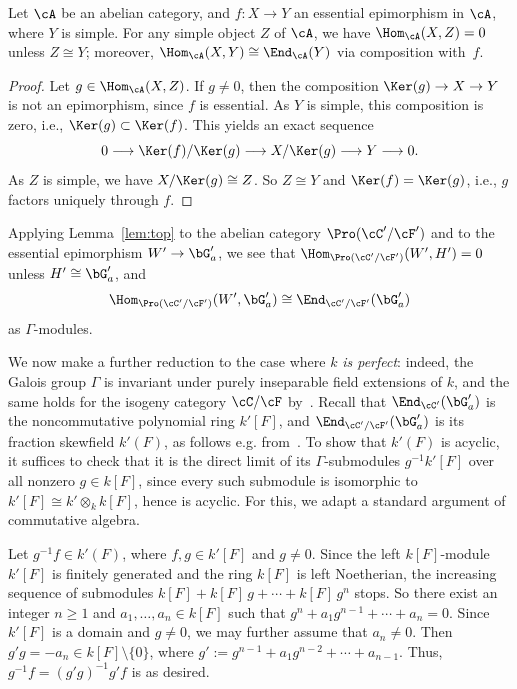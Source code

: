\begin{lemm}\label{lem:top}
Let $\cA$ be an abelian category, and $f : X \to Y$ an essential epimorphism in $\cA$, where $Y$ is simple. For any simple object $Z$ of $\cA$, we have $\Hom_{\cA}(X,Z) = 0$ unless $Z \cong Y$; moreover, $\Hom_{\cA}(X,Y) \cong \End_{\cA}(Y)$ via composition with~$f$.
\end{lemm}

\begin{proof}
Let $g \in \Hom_{\cA}(X,Z)$. If $g \neq 0$, then the composition $\Ker(g) \to X \to Y$ is not an epimorphism, since $f$ is essential. As $Y$ is simple, this composition is zero, i.e., $\Ker(g) \subset \Ker(f)$. This yields an exact sequence
\[
0 \longrightarrow \Ker(f)/\Ker(g) \longrightarrow X/\Ker(g) \longrightarrow Y \longrightarrow 0.
\]
As $Z$ is simple, we have $X/\Ker(g) \cong Z$. So $Z \cong Y$ and $\Ker(f) = \Ker(g)$, i.e., $g$ factors uniquely through $f$.
\end{proof}

Applying Lemma~\ref{lem:top} to the abelian category $\Pro(\cC'/\cF')$ and to the essential epimorphism $W' \to \bG'_a$, we see that $\Hom_{\Pro(\cC'/\cF')}(W',H') = 0$ unless $H' \cong \bG'_a$, and
\[
\Hom_{\Pro(\cC'/\cF')}(W',\bG'_a)
\cong \End_{\cC'/\cF'}(\bG'_a)
\]
as $\Gamma$-modules.

We now make a further reduction to the case where $k$ \emph{is perfect}: indeed, the Galois group $\Gamma$ is invariant under purely inseparable field extensions of $k$, and the same holds for the isogeny category $\cC/\cF$ by~\cite[Thm.~3.11]{Br17a}. Recall that $\End_{\cC'}(\bG'_a)$ is the noncommutative polynomial ring $k'[F]$, and $\End_{\cC'/\cF'}(\bG'_a)$ is its fraction skewfield $k'(F)$, as follows e.g. from~\cite[V.3.6.7]{DG}. To show that $k'(F)$ is acyclic, it suffices to check that it is the direct limit of its $\Gamma$-submodules $g^{-1} k'[F]$ over all nonzero $g \in k[F]$, since every such submodule is isomorphic to $k'[F] \cong k' \otimes_k k[F]$, hence is acyclic. For this, we adapt a standard argument of commutative algebra.

Let $g^{-1}f \in k'(F)$, where $f,g \in k'[F]$ and $g \neq 0$. Since the left $k[F]$-module $k'[F]$ is finitely generated and the ring $k[F]$ is left Noetherian, the increasing sequence of submodules $k[F] + k[F]\, g + \cdots + k[F] \, g^n$ stops. So there exist an integer $n \geq 1$ and $a_1,\ldots, a_n \in k[F]$ such that $g^n + a_1 g^{n-1} + \cdots + a_n = 0$. Since $k'[F]$ is a domain and $g \neq 0$, we may further assume that $a_n \neq 0$. Then $g' g = - a_n \in k[F] \setminus \{ 0 \}$, where $g' := g^{n-1} + a_1 g^{n-2} + \cdots + a_{n-1}$. Thus, $g^{-1} f = (g'g)^{-1} g'f$ is as desired.

